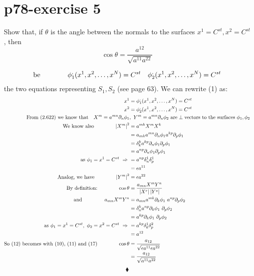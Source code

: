 \section{p78-exercise 5}
\begin{tcolorbox}
Show that, if $\theta$ is the angle between the normals to the surfaces $x^1 = C^{st}, x^2 = C^{st}$, then $$ \cos \theta = \frac{a^{12}}{\sqrt{a^{11}a^{22}}}$$
\end{tcolorbox}
\begin{align}
\text{be}\quad\quad\quad\quad \phi^{,}_1(x^1,x^2,\dots,x^N) = C^{st} \quad \phi^{,}_2(x^1,x^2,\dots,x^N) = C^{st}
\end{align}
the two equations representing $S_1, S_2$ (see page 63). We can rewrite (1) as:
\begin{align}
\ x^1 &= \phi^{,}_1(x^1,x^2,\dots,x^N) = C^{st} \\
\ x^2 &= \phi^{,}_2(x^1,x^2,\dots,x^N) = C^{st}\\
\text{From (2.622) we know that}\quad X^m = a^{mn}\partial_n \phi_{1} & ,\ Y^m = a^{mn}\partial_n \phi_{2} \ \text{are}\perp\text{vectors to the surfaces}\  \phi_{1},\phi_{2}\\
\text{We know also} \spatie \left|X^m\right |^2 &= a^{mk}X^mX^k\\
\ & = a_{mk}a^{mn}\partial_n \phi_{1}a^{kp}\partial_p \phi_{1}\\
\ & = \delta^k_k a^{kp}\partial_n \phi_{1}\partial_p \phi_{1}\\
\ & = a^{np}\partial_n \phi_{1}\partial_p \phi_{1}\\
\text{as} \ \phi_1 = x^1 = C^{st} \ \Rightarrow \ &= a^{np}\delta^1_n \delta^1_p\\
\ &= \epsilon a^{11}\\
\text{Analog, we have}\spatie \left|Y^m\right |^2 &= \epsilon a^{22}\\
\text{By definition:}\spatie \cos\theta &= \frac{a_{mn}X^mY^n}{ \left|X^r\right | \left|Y^s\right |}\\
\text{and }\spatie a_{mn}X^mY^n &= a_{mn} a^{mk}\partial_k \phi_{1} \  a^{np}\partial_p \phi_{2}\\
\ &=\delta^k_n a^{np}\partial_k \phi_{1} \ \partial_p \phi_{2}\\
\ &=a^{kp}\partial_k \phi_{1} \ \partial_p \phi_{2}\\
\text{as} \ \phi_1 = x^1 = C^{st},  \ \phi_2 = x^2 = C^{st} \ \Rightarrow \ &= a^{kp}\delta^1_k\delta^2_p\\
\ &= a^{12}\\
\text{So (12) becomes with (10), (11) and (17)} \spatie \cos\theta &= \frac{a_{12}}{ \sqrt{\epsilon a^{11}\epsilon a^{22}}}\\
&= \frac{a_{12}}{ \sqrt{ a^{11} a^{22}}}
\end{align}
$$\blacklozenge$$
\newpage

